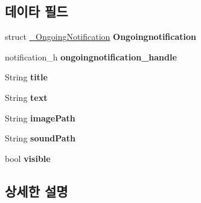 \subsection*{데이타 필드}
\begin{DoxyCompactItemize}
\item 
\hypertarget{struct__OngoingNotificationExtend_ae6e96ac9bd41838e84b87ca988c9bf29}{struct \hyperlink{struct__OngoingNotification}{\-\_\-\-Ongoing\-Notification} {\bfseries Ongoingnotification}}\label{struct__OngoingNotificationExtend_ae6e96ac9bd41838e84b87ca988c9bf29}

\item 
\hypertarget{struct__OngoingNotificationExtend_a51c003647fa5a319570219a88a5672ec}{notification\-\_\-h {\bfseries ongoingnotification\-\_\-handle}}\label{struct__OngoingNotificationExtend_a51c003647fa5a319570219a88a5672ec}

\item 
\hypertarget{struct__OngoingNotificationExtend_a499aeec850a240ae1aecd939c5043590}{String {\bfseries title}}\label{struct__OngoingNotificationExtend_a499aeec850a240ae1aecd939c5043590}

\item 
\hypertarget{struct__OngoingNotificationExtend_a685ed5195435d2b3e75433f46aec6e1e}{String {\bfseries text}}\label{struct__OngoingNotificationExtend_a685ed5195435d2b3e75433f46aec6e1e}

\item 
\hypertarget{struct__OngoingNotificationExtend_a7480fd65ec0c3010b75b111ed2611adb}{String {\bfseries image\-Path}}\label{struct__OngoingNotificationExtend_a7480fd65ec0c3010b75b111ed2611adb}

\item 
\hypertarget{struct__OngoingNotificationExtend_ac2d6721b778cd06197fc40a5595c54e1}{String {\bfseries sound\-Path}}\label{struct__OngoingNotificationExtend_ac2d6721b778cd06197fc40a5595c54e1}

\item 
\hypertarget{struct__OngoingNotificationExtend_aa54a57ae048476d840caf6d4d2c47aa3}{bool {\bfseries visible}}\label{struct__OngoingNotificationExtend_aa54a57ae048476d840caf6d4d2c47aa3}

\end{DoxyCompactItemize}


\subsection{상세한 설명}


